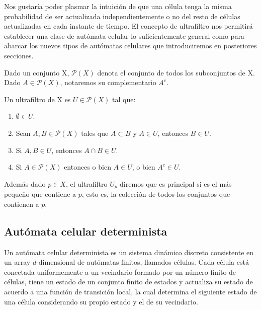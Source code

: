 \documentclass[../proyecto.tex]{memoir}
\begin{document}
Nos gustaría poder plasmar la intuición de que una célula tenga la misma probabilidad de ser actualizada independientemente o no del resto de células actualizadas en cada instante de tiempo. El concepto de ultrafiltro nos permitirá establecer una clase de autómata celular lo suficientemente general como para abarcar los nuevos tipos de autómatas celulares que introduciremos en posteriores secciones. 

Dado un conjunto X, $\mathcal{P}(X)$ denota el conjunto de todos los subconjuntos de X. Dado $A \in \mathcal{P}(X)$, notaremos su complementario $A^{c}$. 
\begin{defi}
Un ultrafiltro de X es $U \in \mathcal{P}(X)$ tal que:

\begin{enumerate}
\item $\emptyset \in U$.
\item Sean $A,B \in \mathcal{P}(X)$ tales que $A \subset B$ y $ A \in U$, entonces $B \in U$.
\item Si $A,B \in U$, entonces $A \cap B \in U$.
\item Si $A \in \mathcal{P}(X)$ entonces o bien $A \in U$, o bien $ A^{c} \in U$.
\end{enumerate}

Además dado $p \in X$, el ultrafiltro $U_{p}$ diremos que es principal si es el más pequeño que contiene a $p$, esto es, la colección de todos los conjuntos que contienen a $p$.
\end{defi}

\subsection{Autómata celular determinista}
Un autómata celular determinista es un sistema dinámico discreto consistente en un array $d$-dimensional de autómatas finitos, llamados células. Cada célula está conectada uniformemente a un vecindario formado por un número finito de células, tiene un estado de un conjunto finito de estados y actualiza su estado de acuerdo a una función de transición local, la cual determina el siguiente estado de una célula considerando su propio estado y el de su vecindario. 
\end{document}
